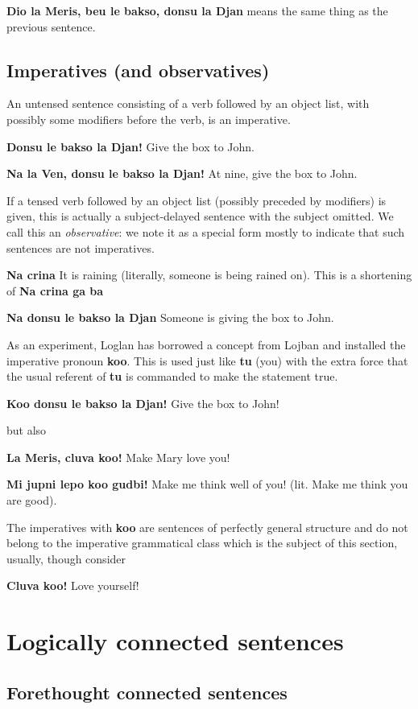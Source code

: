 \documentclass[12pt]{book}
\begin{document}
{{\bf Dio la Meris, beu le bakso, donsu la Djan}  means the same thing as the previous sentence.

\subsection{Imperatives (and observatives)}

An untensed sentence consisting of a verb followed by an object list, with possibly some modifiers before the verb, is an imperative.

{\bf Donsu le bakso la Djan!}  Give the box to John.

{\bf Na la Ven, donsu le bakso la Djan!}  At nine, give the box to John.

If a tensed verb followed by an object list (possibly preceded by modifiers) is given, this is actually a subject-delayed sentence with the subject omitted.  We call this
an {\em observative\/}:  we note it as a special form mostly to indicate that such sentences are not imperatives.

{\bf Na crina}  It is raining (literally, someone is being rained on).  This is a shortening of {\bf Na crina ga ba}

{\bf Na donsu le bakso la Djan}  Someone is giving the box to John.

As an experiment, Loglan has borrowed a concept from Lojban and installed the imperative pronoun {\bf koo}.  This is used just like {\bf tu} (you) with the extra force that the usual
referent of {\bf tu} is commanded to make the statement true.

{\bf Koo donsu le bakso la Djan!}  Give the box to John!

but also

{\bf La Meris, cluva koo!}  Make Mary love you!

{\bf Mi jupni lepo koo gudbi!}  Make me think well of you! (lit.  Make me think you are good).

The imperatives with {\bf koo} are sentences of perfectly general structure and do not belong to the imperative grammatical class which is the subject of this section, usually, though consider

{\bf Cluva koo!}  Love yourself!

\section{Logically connected sentences}

\subsection{Forethought connected sentences}

}
\end{document}
